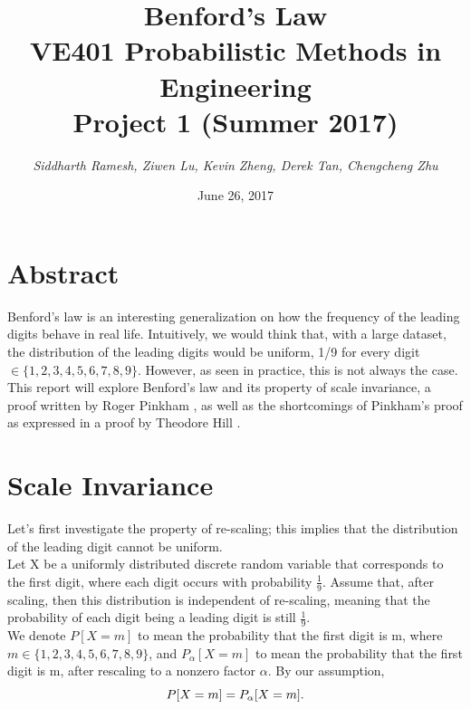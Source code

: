 \documentclass[12pt, titlepage]{article}
\begin{document}
\title{\LARGE \textbf{ Benford's Law} \\
	\vspace{2ex}
	\large VE401 Probabilistic Methods in Engineering \\
    Project 1 (Summer 2017)}
\date{June 26, 2017}
\author{\textit{Siddharth Ramesh, Ziwen Lu, Kevin Zheng, Derek Tan, Chengcheng Zhu}}

\maketitle
{}
\pagebreak
\tableofcontents
\pagebreak
\setcounter{page}{1}

\section{Abstract}

Benford's law \cite{benford} is an interesting generalization on how the frequency of the leading digits behave in real life. Intuitively, we would think that, with a large dataset, the distribution of the leading digits would be uniform, 1/9 for every digit $\in \{1, 2, 3, 4, 5, 6, 7, 8, 9\}$. However, as seen in practice, this is not always the case. This report will explore Benford's law and its property of scale invariance, a proof written by Roger Pinkham \cite{pinkham}, as well as the shortcomings of Pinkham's proof as expressed in a proof by Theodore Hill \cite{hill}.

\section{Scale Invariance}

Let's first investigate the property of re-scaling; this implies that the distribution of the leading digit cannot be uniform. \\

Let X be a uniformly distributed discrete random variable that corresponds to the first digit, where each digit occurs with probability $\frac{1}{9}$. Assume that, after scaling, then this distribution is independent of re-scaling, meaning that the probability of each digit being a leading digit is still $\frac{1}{9}$. \\

We denote $P[X = m]$ to mean the probability that the first digit is m, where $m \in \{1, 2, 3, 4, 5, 6, 7, 8, 9\}$, and $P_\alpha[X = m]$ to mean the probability that the first digit is m, after rescaling to a nonzero factor $\alpha$. By our assumption, 
\begin{equation*}
P[X = m] = P_\alpha[X = m]. \\ 
\end{equation*}
\end{document}

